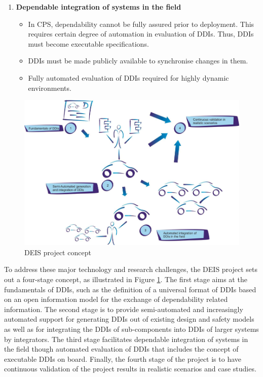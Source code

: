 \begin{enumerate}
	\item \textbf{Dependable integration of systems in the field}
		\begin{itemize}
			\item In CPS, dependability cannot be fully assured prior to deployment. This requires certain degree of automation in evaluation of DDIs. Thus, DDIs must become executable specifications.
			\item DDIs must be made publicly available to synchronise changes in them.
			\item Fully automated evaluation of DDIs required for highly dynamic environments.
		\end{itemize}
\end{enumerate}

\begin{figure}[ht!]
	\centering
	\includegraphics[width=1\linewidth]{./fig/proj_concept.png}
	\caption{DEIS project concept}
	\label{fig:proj_concept}
\end{figure}

To address these major technology and research challenges, the DEIS project sets out a four-stage concept, as illustrated in Figure \ref{fig:proj_concept}. The first stage aims at the fundamentals of DDIs, such as the definition of a universal format of DDIs based on an open information model for the exchange of dependability related information. The second stage is to provide semi-automated and increasingly automated support for generating DDIs out of existing design and safety models as well as for integrating the DDIs of sub-components into DDIs of larger systems by integrators. The third stage facilitates dependable integration of systems in the field though automated evaluation of DDIs that includes the concept of executable DDIs on board. Finally, the fourth stage of the project is to have continuous validation of the project results in realistic scenarios and case studies.



